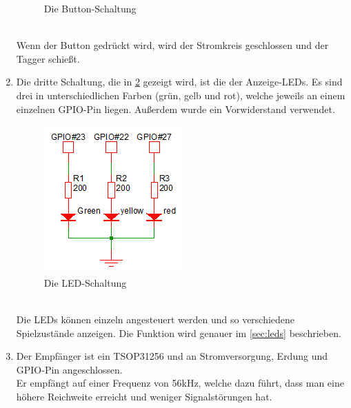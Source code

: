 \begin{enumerate}
\begin{figure}[h]
		\caption{Die Button-Schaltung}
		\label{fig:Bild3Hardware}
	\end{figure}\\
	Wenn der Button gedrückt wird, wird der Stromkreis geschlossen und der Tagger schießt.
	\item Die dritte Schaltung, die in \cref{fig:Bild4Hardware} gezeigt wird, ist die der Anzeige-LEDs. Es sind drei in unterschiedlichen Farben (grün, gelb und rot), welche jeweils an einem einzelnen GPIO-Pin liegen. Außerdem wurde ein Vorwiderstand verwendet.\\
	\begin{figure}[h]
		\centering
		\includegraphics[width=0.3 \textwidth]{./040-komponenten/010-hardware/LEDschaltung.png}
		\caption{Die LED-Schaltung}
		\label{fig:Bild4Hardware}
	\end{figure}\\
	Die LEDs können einzeln angesteuert werden und so verschiedene Spielzustände anzeigen. Die Funktion wird genauer im \cref{sec:leds} beschrieben.
	\item Der Empfänger ist ein TSOP31256 und an Stromversorgung, Erdung und GPIO-Pin angeschlossen.\\
	Er empfängt auf einer Frequenz von 56kHz, welche dazu führt, dass man eine höhere Reichweite erreicht und weniger Signalstörungen hat.

\end{enumerate}
